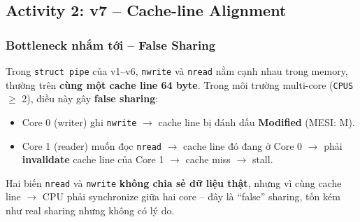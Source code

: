 \documentclass[11pt,a4paper]{article}
\begin{document}
\subsection{Activity 2: v7 -- Cache-line Alignment}

\subsubsection{Bottleneck nhắm tới -- False Sharing}

Trong \texttt{struct pipe} của v1--v6, \texttt{nwrite} và \texttt{nread} nằm cạnh nhau trong memory, thường trên \textbf{cùng một cache line 64 byte}. Trong môi trường multi-core (\texttt{CPUS} $\geq$ 2), điều này gây \textbf{false sharing}:

\begin{itemize}
  \item Core 0 (writer) ghi \texttt{nwrite} $\rightarrow$ cache line bị đánh dấu \textbf{Modified} (MESI: M).
  \item Core 1 (reader) muốn đọc \texttt{nread} $\rightarrow$ cache line đó đang ở Core 0 $\rightarrow$ phải \textbf{invalidate} cache line của Core 1 $\rightarrow$ cache miss $\rightarrow$ stall.
\end{itemize}

Hai biến \texttt{nread} và \texttt{nwrite} \textbf{không chia sẻ dữ liệu thật}, nhưng vì cùng cache line $\rightarrow$ CPU phải synchronize giữa hai core -- đây là ``false'' sharing, tốn kém như real sharing nhưng không có lý do.
\end{document}
